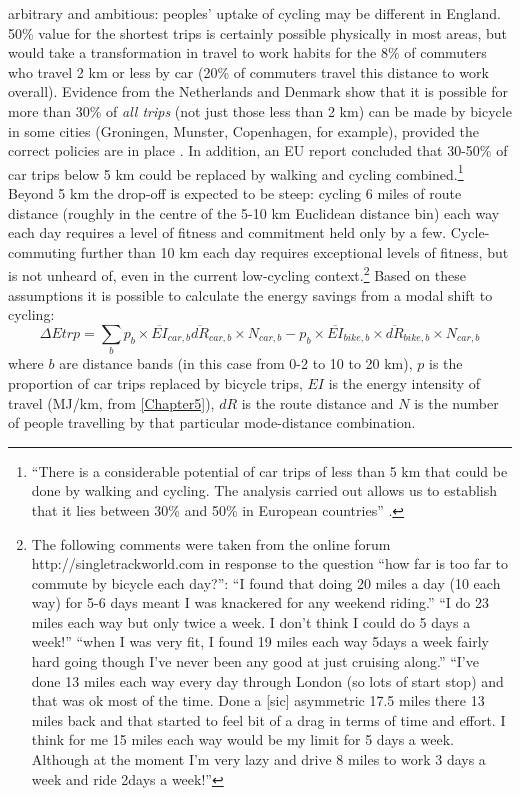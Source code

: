 arbitrary and ambitious: peoples' uptake of cycling may be different in England.
50\% value for the shortest trips is certainly possible physically in most
areas, but would
take a transformation in travel to work habits for the 8\% of commuters who
travel 2 km or less by car (20\% of commuters travel this distance to work
overall). Evidence from the Netherlands and Denmark show that it
is possible for more than 30\% of \emph{all trips} (not just those less than 2
km) can be made by bicycle in some cities (Groningen, Munster, Copenhagen,
for example), provided the correct policies are in place \citep{Rietveld2004,
Pucher2010}.
In addition, an EU report concluded that 30-50\% of car trips below
5 km could be replaced by walking and cycling
combined.\footnote{``There
is a considerable potential of car trips of less than 5 km that could be
done by walking and cycling. The analysis carried out allows us to establish
that it lies between 30\% and 50\% in European countries''
\citep[p.~60]{Gnavi1999walcying}.
}
Beyond 5 km the drop-off is expected to be steep: cycling 6 miles of route
distance (roughly in the centre of the 5-10 km Euclidean distance bin) each way
each day requires a level of fitness and commitment held only by a few.
Cycle-commuting further than 10 km each day requires exceptional levels of
fitness, but is not unheard of, even in the current low-cycling
context.\footnote{The following comments
were taken from the online forum http://singletrackworld.com in response to
the question ``how far is too far to commute by bicycle each day?'': ``I found
that doing 20 miles a day (10 each way) for 5-6 days meant I was knackered for
any weekend riding.'' ``I do 23 miles each way but only twice a week. I don't
think I could do 5 days a week!''  ``when I was very fit, I found 19 miles each
way 5days a week fairly hard going though I've never been any good at just
cruising along.'' ``I've done 13 miles each way every day through London (so
lots of start stop) and that was ok most of the time. Done a [sic] asymmetric 17.5
miles there 13 miles back and that started to feel bit of a drag in terms of
time and effort. I think for me 15 miles each way would be my limit for 5
days a week.
Although at the moment I'm very lazy and drive 8 miles to work 3 days a week and
ride 2days a week!''
}
Based on these assumptions it is possible to calculate the energy savings from
a modal shift to cycling:
\begin{equation}
 \Delta Etrp = \sum_{b} p_b \times \overline{EI}_{car,b}
\overline{dR}_{car,b} \times N_{car,b} - p_b \times \overline{EI}_{bike,b}
\times \overline{dR}_{bike,b} \times N_{car,b}
\end{equation}
where $b$ are distance bands (in this case from 0-2 to 10 to 20 km), $p$ is
the proportion of car trips replaced by bicycle trips, $EI$ is the energy
intensity of travel (MJ/km, from \cref{Chapter5}), $dR$ is the route distance
and $N$ is the number of people travelling by that particular mode-distance
combination. 

